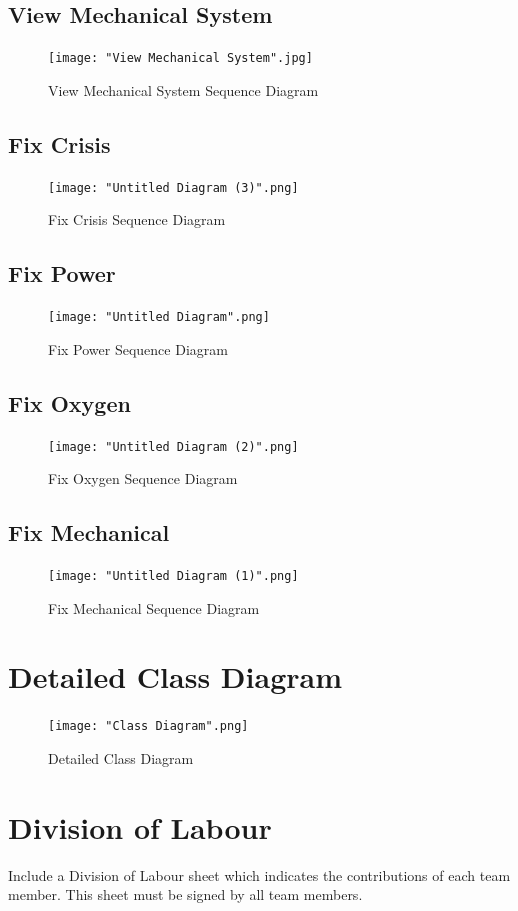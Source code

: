 \documentclass[12pt, titlepage]{article}
\begin{document}
\subsection*{View Mechanical System}
\begin{figure}[H]
\centering
\texttt{[image: "View Mechanical System".jpg]}
\caption{View Mechanical System Sequence Diagram}
\end{figure}
\subsection*{Fix Crisis}
\begin{figure}[H]
\centering
\texttt{[image: "Untitled Diagram (3)".png]}
\caption{Fix Crisis Sequence Diagram}
\end{figure}
\subsection*{Fix Power}
\begin{figure}[H]
\centering
\texttt{[image: "Untitled Diagram".png]}
\caption{Fix Power Sequence Diagram}
\end{figure}
\subsection*{Fix Oxygen}
\begin{figure}[H]
\centering
\texttt{[image: "Untitled Diagram (2)".png]}
\caption{Fix Oxygen Sequence Diagram}
\end{figure}
\subsection*{Fix Mechanical}
\begin{figure}[H]
\centering
\texttt{[image: "Untitled Diagram (1)".png]}
\caption{Fix Mechanical Sequence Diagram}
\end{figure}

\section{Detailed Class Diagram}
\label{sec:detailed_class_diagram}
\begin{figure}[H]
\centering
\texttt{[image: "Class Diagram".png]}
\caption{Detailed Class Diagram}
\end{figure}
\newpage
\appendix
\section{Division of Labour}
\label{sec:division_of_labour}
Include a Division of Labour sheet which indicates the contributions of each team member. This sheet must be signed by all team members.
\end{document}
